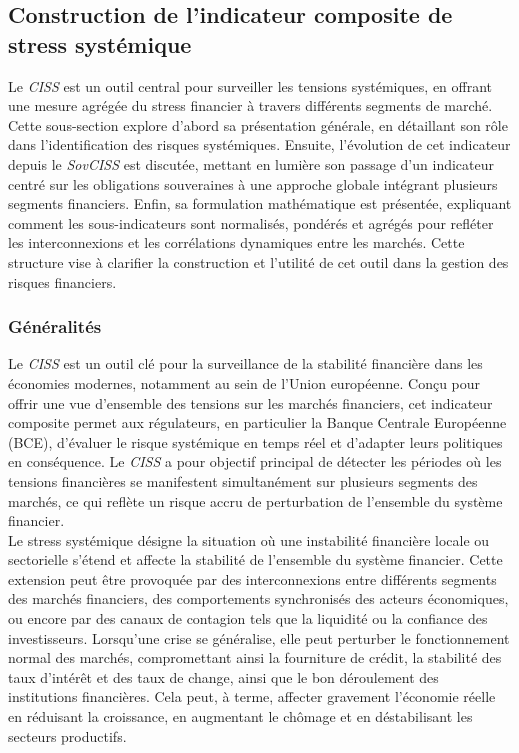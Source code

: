 \begin{sloppypar}
\subsection{Construction de l'indicateur composite de stress systémique}

Le \textit{CISS} est un outil central pour surveiller les tensions systémiques, en offrant une mesure agrégée du stress financier à travers différents segments de marché. Cette sous-section explore d’abord sa présentation générale, en détaillant son rôle dans l’identification des risques systémiques. Ensuite, l’évolution de cet indicateur depuis le \textit{SovCISS} est discutée, mettant en lumière son passage d’un indicateur centré sur les obligations souveraines à une approche globale intégrant plusieurs segments financiers. Enfin, sa formulation mathématique est présentée, expliquant comment les sous-indicateurs sont normalisés, pondérés et agrégés pour refléter les interconnexions et les corrélations dynamiques entre les marchés. Cette structure vise à clarifier la construction et l’utilité de cet outil dans la gestion des risques financiers.

\subsubsection{Généralités}

Le \textit{CISS} est un outil clé pour la surveillance de la stabilité financière dans les économies modernes, notamment au sein de l'Union européenne. Conçu pour offrir une vue d'ensemble des tensions sur les marchés financiers, cet indicateur composite permet aux régulateurs, en particulier la Banque Centrale Européenne (BCE), d’évaluer le risque systémique en temps réel et d’adapter leurs politiques en conséquence. Le \textit{CISS} a pour objectif principal de détecter les périodes où les tensions financières se manifestent simultanément sur plusieurs segments des marchés, ce qui reflète un risque accru de perturbation de l’ensemble du système financier.\\

Le stress systémique désigne la situation où une instabilité financière locale ou sectorielle s'étend et affecte la stabilité de l'ensemble du système financier. Cette extension peut être provoquée par des interconnexions entre différents segments des marchés financiers, des comportements synchronisés des acteurs économiques, ou encore par des canaux de contagion tels que la liquidité ou la confiance des investisseurs. Lorsqu'une crise se généralise, elle peut perturber le fonctionnement normal des marchés, compromettant ainsi la fourniture de crédit, la stabilité des taux d'intérêt et des taux de change, ainsi que le bon déroulement des institutions financières. Cela peut, à terme, affecter gravement l'économie réelle en réduisant la croissance, en augmentant le chômage et en déstabilisant les secteurs productifs.\\


\end{sloppypar}
